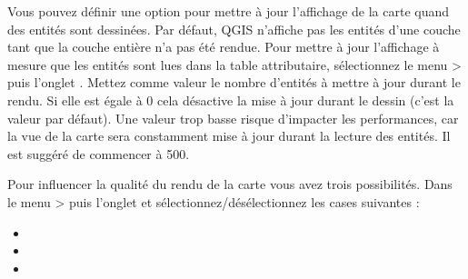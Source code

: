 \label{label_updatemap}

Vous pouvez définir une option pour mettre à jour l'affichage de la carte quand des entités sont dessinées. Par défaut, QGIS n'affiche pas les entités d'une couche tant que la couche entière n'a pas été rendue. Pour mettre à jour l'affichage à mesure que les entités sont lues dans la table attributaire, sélectionnez le menu  >  puis l'onglet . Mettez comme valeur le nombre d'entités à mettre à jour durant le rendu. Si elle est égale à 0 cela désactive la mise à jour durant le dessin (c'est la valeur par défaut). Une valeur trop basse risque d'impacter les performances, car la vue de la carte sera constamment mise à jour durant la lecture des entités. Il est suggéré de commencer à 500.

%
%

\label{label_renderquality}

Pour influencer la qualité du rendu de la carte vous avez trois possibilités. Dans le menu  >  puis l'onglet  et sélectionnez/désélectionnez les cases suivantes :

\begin{itemize}
\item {}
\item {}
\item {}
\end{itemize}

